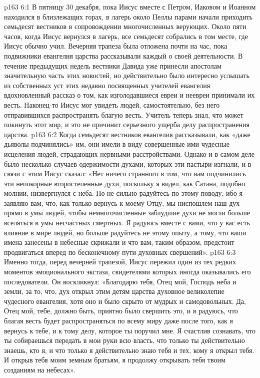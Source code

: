 \vs p163 6:1 В пятницу 30 декабря, пока Иисус вместе с Петром, Иаковом и Иоанном находился в близлежащих горах, в лагерь около Пеллы парами начали приходить семьдесят вестников в сопровождении многочисленных верующих. Около пяти часов, когда Иисус вернулся в лагерь, все семьдесят собрались в том месте, где Иисус обычно учил. Вечерняя трапеза была отложена почти на час, пока подвижники евангелия царства рассказывали каждый о своей деятельности. В течение предыдущих недель вестники Давида уже принесли апостолам значительную часть этих новостей, но действительно было интересно услышать из собственных уст этих недавно посвященных учителей евангелия вдохновленный рассказ о том, как изголодавшиеся евреи и неевреи принимали их весть. Наконец\hyp{}то Иисус мог увидеть людей, самостоятельно, без него отправившихся распространять благую весть. Учитель теперь знал, что может покинуть этот мир, и это не причинит серьезного ущерба делу распространения царства.
\vs p163 6:2 Когда семьдесят вестников евангелия рассказывали, как «даже дьяволы подчинялись» им, они имели в виду совершенные ими чудесные исцеления людей, страдающих нервными расстройствами. Однако и в самом деле было несколько случаев одержимости духами, которых эти пастыри изгнали, и в связи с этим Иисус сказал: «Нет ничего странного в том, что вам подчинились эти непокорные второстепенные духи, поскольку я видел, как Сатана, подобно молнии, низвергнулся с неба. Но не сильно радуйтесь по этому поводу, ибо я заявляю вам, что, как только вернусь к моему Отцу, мы ниспошлем наш дух прямо в умы людей, чтобы немногочисленные заблудшие духи не могли больше вселяться в умы несчастных смертных. Я радуюсь вместе с вами, что у вас есть влияние в мире людей, но больше радуйтесь не этому опыту, а тому, что ваши имена занесены в небесные скрижали и что вам, таким образом, предстоит продвигаться вперед по бесконечному пути духовных свершений».
\vs p163 6:3 Именно тогда, перед вечерней трапезой, Иисус пережил один из тех редких моментов эмоционального экстаза, свидетелями которых иногда оказывались его последователи. Он воскликнул: «Благодарю тебя, Отец мой, Господь неба и земли, за то, что, дух открыл этим детям царства духовное великолепие чудесного евангелия, хотя оно и было скрыто от мудрых и самодовольных. Да, Отец мой, тебе, должно быть, приятно было свершить это, и я радуюсь, что благая весть будет распространяться по всему миру даже после того, как я вернусь к тебе, и к тому делу, которое ты поручил мне. Я счастлив сознавать, что ты собираешься передать в мои руки всю власть, что только ты действительно знаешь, кто я, и что только я действительно знаю тебя и тех, кому я открыл тебя. И открыв тебя моим земным братьям, я продолжу открывать тебя твоим созданиям на небесах».
